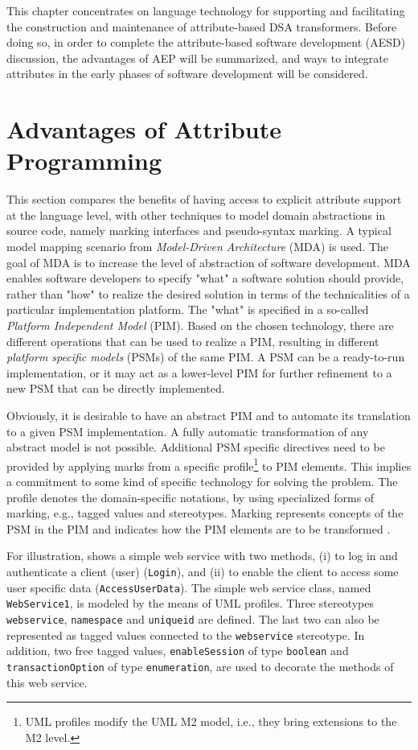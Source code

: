 This chapter concentrates on language technology for supporting and facilitating the construction and maintenance of attribute-based DSA transformers. Before doing so, in order to complete the attribute-based software development (AESD) discussion, the advantages of AEP will be summarized, and ways to integrate attributes in the early phases of software development will be considered.

\section{Advantages of Attribute Programming}
\label{sec:gaast-mda}

This section compares the benefits of having access to explicit attribute support at the language level, with other techniques to model domain abstractions in source code, namely marking interfaces and pseudo-syntax marking. A typical model mapping scenario from \textit{Model-Driven Architecture} (MDA) \cite{mda,mda.frankel} is used. The goal of MDA is to increase the level of abstraction of software development. MDA enables software developers to specify "what" a software solution should provide, rather than "how" to realize the desired solution in terms of the technicalities of a particular implementation platform. The "what" is specified in a so-called \textit{Platform Independent Model} (PIM). Based on the chosen technology, there are different operations that can be used to realize a PIM, resulting in different \textit{platform specific models} (PSMs) of the same PIM. A PSM can be a ready-to-run implementation, or it may act as a lower-level PIM for further refinement to a new PSM that can be directly implemented.

Obviously, it is desirable to have an abstract PIM and to automate its translation to a given PSM implementation. A fully automatic transformation of any abstract model is not possible. Additional PSM specific directives need to be provided by applying marks from a specific profile\footnote{UML profiles modify the UML M2 model, i.e., they bring extensions to the M2 level.} to PIM elements. This implies a commitment to some kind of specific technology for solving the problem. The profile denotes the domain-specific notations, by using specialized forms of marking, e.g., tagged values and stereotypes. Marking represents concepts of the PSM in the PIM and indicates how the PIM elements are to be transformed \cite{mda.guide}. 

For illustration,  shows a simple web service with two methods, (i) to log in and authenticate a client (user) ({\tt Lo\-gin}), and (ii) to enable the client to access some user specific data ({\tt Access\-User\-Data}). The simple web service class, named \texttt{Web\-Ser\-vi\-ce1}, is modeled by the means of UML profiles. Three stereotypes {\tt \flqq web\-ser\-vi\-ce\frqq}, {\tt \flqq namespace\frqq} and {\tt \flqq uniqueid\frqq} are defined. The last two can also be represented as tagged values connected to the {\tt \flqq web\-ser\-vi\-ce\frqq{}} stereotype. In addition, two free tagged values, \texttt{ena\-ble\-Se\-ssion} of type \texttt{boolean} and \texttt{tran\-sac\-ti\-on\-Opti\-on} of type {\tt enu\-me\-ra\-tion}, are used to decorate the methods of this web service.

